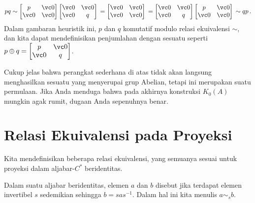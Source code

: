     \[ pq \sim \begin{bmatrix} p & \vc 0 \\ \vc 0 & \vc 0 \end{bmatrix} \begin{bmatrix} \vc 0 & \vc 0 \\ \vc 0 & q \end{bmatrix}  \\
                   = \begin{bmatrix} \vc 0 & \vc 0 \\ \vc 0 & \vc 0 \end{bmatrix}           \\
                   =  \begin{bmatrix} \vc 0 & \vc 0 \\ \vc 0 &  q \end{bmatrix}\begin{bmatrix} p & \vc 0 \\ \vc 0 & \vc 0 \end{bmatrix}  \\
                   \sim qp\,. \]
Dalam gambaran heuristik ini, $p$ dan $q$ komutatif modulo relasi ekuivalensi $\sim$, dan kita dapat mendefinisikan penjumlahan dengan sesuatu seperti
$p \oplus q = \begin{bmatrix} p & \vc 0 \\ \vc 0 & q \end{bmatrix}$.

Cukup jelas bahwa perangkat sederhana di atas tidak akan langsung menghasilkan sesuatu yang menyerupai grup Abelian, tetapi ini merupakan suatu permulaan. Jika Anda menduga
bahwa pada akhirnya konstruksi $K_0(A)$ mungkin agak rumit, dugaan Anda sepenuhnya benar.




\section{Relasi Ekuivalensi pada Proyeksi}

Kita mendefinisikan beberapa relasi ekuivalensi, yang semuanya sesuai untuk proyeksi dalam aljabar-$C^*$ beridentitas.

\begin{defn} Dalam suatu aljabar beridentitas, elemen $a$ dan $b$ disebut
 jika terdapat elemen invertibel $s$ sedemikian sehingga $b = sas^{-1}$.
Dalam hal ini kita menulis $a \sim_s b$.
\end{defn}

